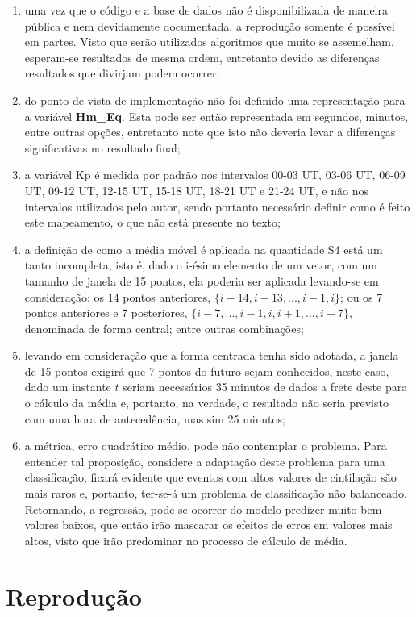 \begin{enumerate}
\item uma vez que o código e a base de dados não é disponibilizada de maneira pública e nem devidamente documentada, a reprodução somente é possível em partes. Visto que serão utilizados algoritmos que muito se assemelham, esperam-se resultados de mesma ordem, entretanto devido as diferenças resultados que divirjam podem ocorrer;
\item do ponto de vista de implementação não foi definido uma representação para a variável {\bf Hm\_Eq}. Esta pode ser então representada em segundos, minutos, entre outras opções, entretanto note que isto não deveria levar a diferenças significativas no resultado final;
\item a variável Kp é medida por padrão nos intervalos 00-03 UT, 03-06 UT, 06-09 UT, 09-12 UT, 12-15 UT, 15-18 UT, 18-21 UT e 21-24 UT, e não nos intervalos utilizados pelo autor, sendo portanto necessário definir como é feito este mapeamento, o que não está presente no texto;
\item a definição de como a média móvel é aplicada na quantidade S4 está um tanto incompleta, isto é, dado o i-ésimo elemento de um vetor, com um tamanho de janela de 15 pontos, ela poderia ser aplicada levando-se em consideração: os 14 pontos anteriores, $\{i-14, i-13, ..., i-1, i\}$; ou os 7 pontos anteriores e 7 posteriores, $\{i-7,...,i-1,i,i+1,...,i+7\}$, denominada de forma central; entre outras combinações;
\item levando em consideração que a forma centrada tenha sido adotada, a janela de 15 pontos exigirá que 7 pontos do futuro sejam conhecidos, neste caso, dado um instante $t$ seriam necessários 35 minutos de dados a frete deste para o cálculo da média e,  portanto, na verdade, o resultado não seria previsto com uma hora de antecedência, mas sim 25 minutos;
\item a métrica, erro quadrático médio, pode não contemplar o problema. Para entender tal proposição, considere a adaptação deste problema para uma classificação, ficará evidente que eventos com altos valores de cintilação são mais raros e, portanto, ter-se-á um problema de classificação não balanceado. Retornando, a regressão, pode-se ocorrer do modelo predizer muito bem valores baixos, que então irão mascarar os efeitos de erros em valores mais altos, visto que irão predominar no processo de cálculo de média.
\end{enumerate}

\section{Reprodução}\label{se:rep}

